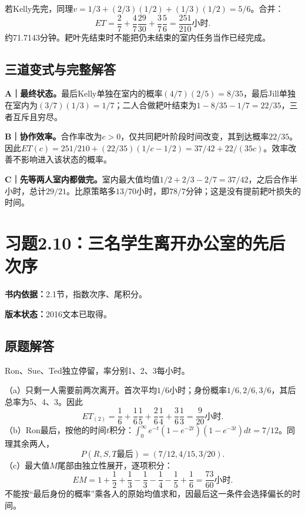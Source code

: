 \documentclass[
  11pt,
  a4paper,
  UTF8,fontset=fandol]{ctexart}
\let\OldSection\section
\renewcommand{\section}{\Needspace{7\baselineskip}\OldSection}
\let\OldSubsection\subsection
\renewcommand{\subsection}{\Needspace{5\baselineskip}\OldSubsection}
\begin{document}
若Kelly先完，同理\(v=1/3+(2/3)(1/2)+(1/3)(1/2)=5/6\)。合并：
\[\boxed{ET=\frac27+\frac47\frac{29}{30}+\frac37\frac56=\frac{251}{210}\text{小时}.}\]
约71.7143分钟。耙叶先结束时不能把仍未结束的室内任务当作已经完成。

\subsection{三道变式与完整解答}\label{ux4e09ux9053ux53d8ux5f0fux4e0eux5b8cux6574ux89e3ux7b54-8}

\textbf{A｜最终状态。}最后Kelly单独在室内的概率\((4/7)(2/5)=8/35\)，最后Jill单独在室内为\((3/7)(1/3)=1/7\)；二人合做耙叶结束为\(1-8/35-1/7=22/35\)，三者互斥且穷尽。

\textbf{B｜协作效率。}合作率改为\(c>0\)，仅共同耙叶阶段时间改变，其到达概率\(22/35\)。因此\(ET(c)=251/210+(22/35)(1/c-1/2)=37/42+22/(35c)\)。效率改善不影响进入该状态的概率。

\textbf{C｜先等两人室内都做完。}室内最大值均值\(1/2+2/3-2/7=37/42\)，之后合作半小时，总计\(29/21\)。比原策略多\(13/70\)小时，即\(78/7\)分钟；这是没有提前耙叶损失的时间。

\newpage

\section{习题2.10：三名学生离开办公室的先后次序}\label{ux4e60ux98982.10ux4e09ux540dux5b66ux751fux79bbux5f00ux529eux516cux5ba4ux7684ux5148ux540eux6b21ux5e8f}

\textbf{书内依据：}2.1节，指数次序、尾积分。

\textbf{版本状态：}2016文本已取得。

\subsection{原题解答}\label{ux539fux9898ux89e3ux7b54-9}

Ron、Sue、Ted独立停留，率分别1、2、3每小时。

（a）只剩一人需要前两次离开。首次平均\(1/6\)小时；身份概率\(1/6,2/6,3/6\)，其后总率为5、4、3。因此
\[\boxed{ET_{(2)}=\frac16+\frac16\frac15+\frac26\frac14+\frac36\frac13=\frac9{20}\text{小时}.}\]
（b）Ron最后，按他的时间\(t\)积分：\(\int_0^\infty e^{-t}(1-e^{-2t})(1-e^{-3t})dt=7/12\)。同理其余两人，
\[\boxed{P(R,S,T\text{最后})=(7/12,4/15,3/20).}\]
（c）最大值\(M\)尾部由独立性展开，逐项积分：
\[\boxed{EM=1+\frac12+\frac13-\frac13-\frac14-\frac15+\frac16=\frac{73}{60}\text{小时}.}\]
不能按``最后身份的概率''乘各人的原始均值求和，因最后这一条件会选择偏长的时间。
\end{document}
